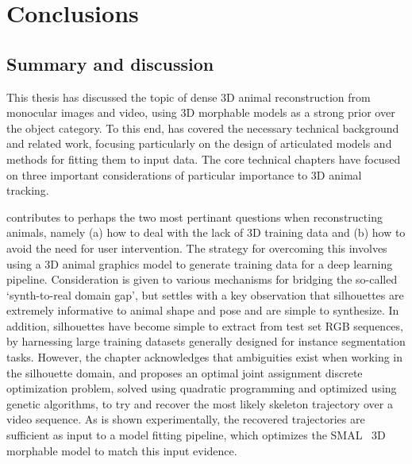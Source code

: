 
\chapter{Conclusions}\label{chap:summary}

\ifpdf
    \graphicspath{{Chapter7/Figs/Raster/}{Chapter7/Figs/PDF/}{Chapter7/Figs/}}
\else
    \graphicspath{{Chapter7/Figs/Vector/}{Chapter7/Figs/}}
\fi

\section{Summary and discussion}

This thesis has discussed the topic of dense 3D animal reconstruction from monocular images and video, using 3D morphable models as a strong prior over the object category. To this end,  has covered the necessary technical background and related work, focusing particularly on the design of articulated models and methods for fitting them to input data. The core technical chapters have focused on three important considerations of particular importance to 3D animal tracking. 

 contributes to perhaps the two most pertinant questions when reconstructing animals, namely (a) how to deal with the lack of 3D training data and (b) how to avoid the need for user intervention. The strategy for overcoming this involves using a 3D animal graphics model to generate training data for a deep learning pipeline. Consideration is given to various mechanisms for bridging the so-called `synth-to-real domain gap', but settles with a key observation that silhouettes are extremely informative to animal shape and pose and are simple to synthesize. In addition, silhouettes have become simple to extract from test set RGB sequences, by harnessing large training datasets generally designed for instance segmentation tasks. However, the chapter acknowledges that ambiguities exist when working in the silhouette domain, and proposes an optimal joint assignment discrete optimization problem, solved using quadratic programming and optimized using genetic algorithms, to try and recover the most likely skeleton trajectory over a video sequence. As is shown experimentally, the recovered trajectories are sufficient as input to a model fitting pipeline, which optimizes the SMAL~\cite{xxx} 3D morphable model to match this input evidence. 

